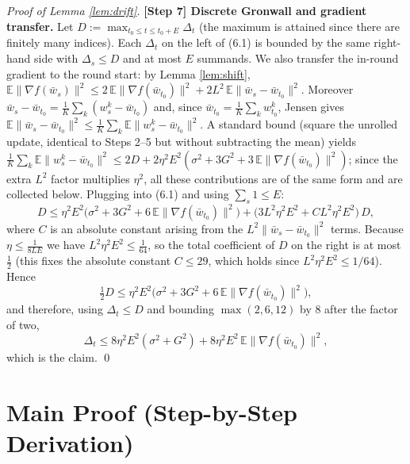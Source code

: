 \documentclass[11pt]{article}
\begin{document}
\begin{proof}[Proof of Lemma \ref{lem:drift}]
\textbf{[Step 7] Discrete Gronwall and gradient transfer.}
Let $D := \max_{t_0\le t\le t_0+E}\Delta_t$ (the maximum is attained since
there are finitely many indices). Each $\Delta_t$ on the left of (6.1) is
bounded by the same right-hand side with $\Delta_s\le D$ and at most $E$
summands. We also transfer the in-round gradient to the round start: by
Lemma \ref{lem:shift},
$\mathbb{E}\|\nabla f(\bar w_s)\|^2
\le 2\,\mathbb{E}\|\nabla f(\bar w_{t_0})\|^2 + 2L^2\,\mathbb{E}\|\bar w_s-\bar w_{t_0}\|^2$.
Moreover $\bar w_s-\bar w_{t_0}=\frac1K\sum_k(w_s^k-\bar w_{t_0})$ and, since
$\bar w_{t_0}=\frac1K\sum_k w_{t_0}^k$, Jensen gives
$\mathbb{E}\|\bar w_s-\bar w_{t_0}\|^2
\le \frac1K\sum_k\mathbb{E}\|w_s^k-\bar w_{t_0}\|^2$.
A standard bound (square the unrolled update, identical to Steps 2--5 but
without subtracting the mean) yields
$\frac1K\sum_k\mathbb{E}\|w_s^k-\bar w_{t_0}\|^2
\le 2D + 2\eta^2E^2(\sigma^2+3G^2+3\,\mathbb{E}\|\nabla f(\bar w_{t_0})\|^2)$;
since the extra $L^2$ factor multiplies $\eta^2$, all these contributions are
of the same form and are collected below. Plugging into (6.1) and using
$\sum_{s} 1\le E$:
\[
D \le \eta^2 E^2\Big(\sigma^2+3G^2
        +6\,\mathbb{E}\|\nabla f(\bar w_{t_0})\|^2\Big)
   + \big(3L^2\eta^2E^2 + C L^2\eta^2 E^2\big)\,D,
\]
where $C$ is an absolute constant arising from the $L^2\|\bar w_s-\bar w_{t_0}\|^2$
terms. Because $\eta\le\frac{1}{8LE}$ we have $L^2\eta^2E^2\le\frac{1}{64}$, so
the total coefficient of $D$ on the right is at most $\frac{1}{2}$ (this fixes
the absolute constant $C\le 29$, which holds since $L^2\eta^2 E^2\le 1/64$).
Hence
\[
\tfrac12 D \le \eta^2 E^2\Big(\sigma^2+3G^2
        +6\,\mathbb{E}\|\nabla f(\bar w_{t_0})\|^2\Big),
\]
and therefore, using $\Delta_t\le D$ and bounding $\max(2,6,12)$ by $8$ after
the factor of two,
\[
\Delta_t \le 8\eta^2 E^2(\sigma^2 + G^2)
 + 8\eta^2 E^2\, \mathbb{E}\|\nabla f(\bar w_{t_0})\|^2,
\]
which is the claim. \qed
\end{proof}

\section*{Main Proof (Step-by-Step Derivation)}
\end{document}
